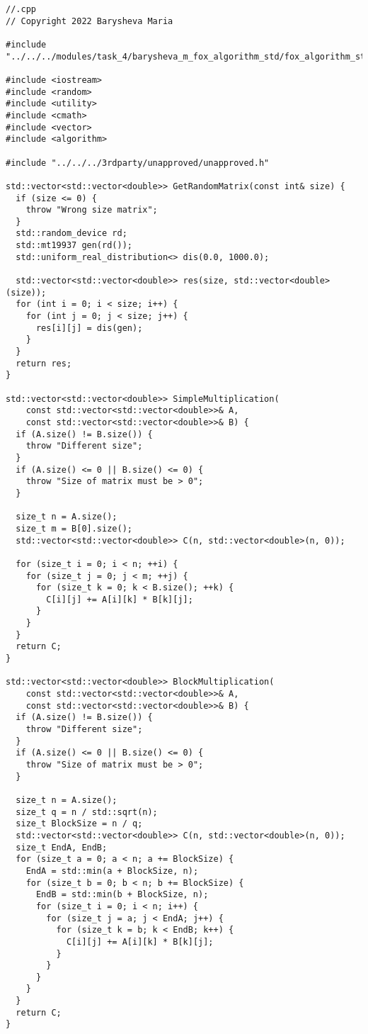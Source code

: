 \documentclass[12pt]{article}
\begin{document}
\begin{lstlisting}
//.cpp
// Copyright 2022 Barysheva Maria

#include "../../../modules/task_4/barysheva_m_fox_algorithm_std/fox_algorithm_std.h"

#include <iostream>
#include <random>
#include <utility>
#include <cmath>
#include <vector>
#include <algorithm>

#include "../../../3rdparty/unapproved/unapproved.h"

std::vector<std::vector<double>> GetRandomMatrix(const int& size) {
  if (size <= 0) {
    throw "Wrong size matrix";
  }
  std::random_device rd;
  std::mt19937 gen(rd());
  std::uniform_real_distribution<> dis(0.0, 1000.0);

  std::vector<std::vector<double>> res(size, std::vector<double>(size));
  for (int i = 0; i < size; i++) {
    for (int j = 0; j < size; j++) {
      res[i][j] = dis(gen);
    }
  }
  return res;
}

std::vector<std::vector<double>> SimpleMultiplication(
    const std::vector<std::vector<double>>& A,
    const std::vector<std::vector<double>>& B) {
  if (A.size() != B.size()) {
    throw "Different size";
  }
  if (A.size() <= 0 || B.size() <= 0) {
    throw "Size of matrix must be > 0";
  }

  size_t n = A.size();
  size_t m = B[0].size();
  std::vector<std::vector<double>> C(n, std::vector<double>(n, 0));

  for (size_t i = 0; i < n; ++i) {
    for (size_t j = 0; j < m; ++j) {
      for (size_t k = 0; k < B.size(); ++k) {
        C[i][j] += A[i][k] * B[k][j];
      }
    }
  }
  return C;
}

std::vector<std::vector<double>> BlockMultiplication(
    const std::vector<std::vector<double>>& A,
    const std::vector<std::vector<double>>& B) {
  if (A.size() != B.size()) {
    throw "Different size";
  }
  if (A.size() <= 0 || B.size() <= 0) {
    throw "Size of matrix must be > 0";
  }

  size_t n = A.size();
  size_t q = n / std::sqrt(n);
  size_t BlockSize = n / q;
  std::vector<std::vector<double>> C(n, std::vector<double>(n, 0));
  size_t EndA, EndB;
  for (size_t a = 0; a < n; a += BlockSize) {
    EndA = std::min(a + BlockSize, n);
    for (size_t b = 0; b < n; b += BlockSize) {
      EndB = std::min(b + BlockSize, n);
      for (size_t i = 0; i < n; i++) {
        for (size_t j = a; j < EndA; j++) {
          for (size_t k = b; k < EndB; k++) {
            C[i][j] += A[i][k] * B[k][j];
          }
        }
      }
    }
  }
  return C;
}


\end{lstlisting}
\end{document}

